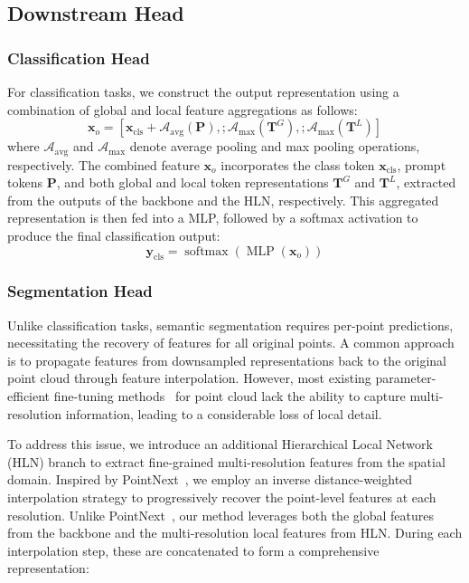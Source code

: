 \subsection{Downstream Head}
\label{sec:head}

\subsubsection{Classification Head}
For classification tasks, we construct the output representation using a combination of global and local feature aggregations as follows:
\begin{equation}
\boldsymbol{x}_o = [\boldsymbol{x}_{\text{cls}} + \mathcal{A}_{\text{avg}}(\boldsymbol{P}), ; \mathcal{A}_{\text{max}}(\boldsymbol{T}^{G}), ; \mathcal{A}_{\text{max}}(\boldsymbol{T}^{L})]
\end{equation}
where $\mathcal{A}_{\text{avg}}$ and $\mathcal{A}_{\text{max}}$ denote average pooling and max pooling operations, respectively. The combined feature $\boldsymbol{x}_o$ incorporates the class token $\boldsymbol{x}_{\text{cls}}$, prompt tokens $\boldsymbol{P}$, and both global and local token representations  $\boldsymbol{T}^{G}$ and $\boldsymbol{T}^{L}$, extracted from the outputs of the backbone and the HLN, respectively. This aggregated representation is then fed into a MLP, followed by a softmax activation to produce the final classification output:
\begin{equation}
\boldsymbol{y}_{\text{cls}} = \operatorname{softmax}\left( \operatorname{MLP}(\boldsymbol{x}_o) \right)
\label{eq:MLP}
\end{equation}


\subsubsection{Segmentation Head}
Unlike classification tasks, semantic segmentation requires per-point predictions, necessitating the recovery of features for all original points. A common approach is to propagate features from downsampled representations back to the original point cloud through feature interpolation. However, most existing parameter-efficient fine-tuning methods~\cite{zha2023instance,zhou2024dynamic,liang2024parameter} for point cloud lack the ability to capture multi-resolution information, leading to a considerable loss of local detail.

To address this issue, we introduce an additional Hierarchical Local Network (HLN) branch to extract fine-grained multi-resolution features from the spatial domain. Inspired by PointNext~\cite{qian2022pointnext}, we employ an inverse distance-weighted interpolation strategy to progressively recover the point-level features at each resolution. Unlike PointNext~\cite{qian2022pointnext}, our method leverages both the global features from the backbone and the multi-resolution local features from HLN. During each interpolation step, these are concatenated to form a comprehensive representation:

